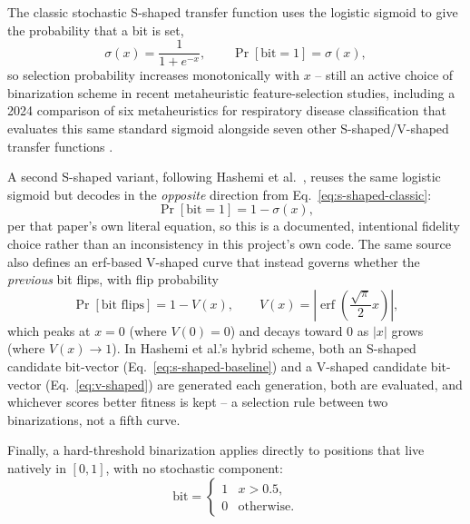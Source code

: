 The classic stochastic S-shaped transfer function uses the logistic
sigmoid to give the probability that a bit is set,
\begin{equation}
  \sigma(x) = \frac{1}{1 + e^{-x}}, \qquad
  \Pr[\text{bit} = 1] = \sigma(x),
  \label{eq:s-shaped-classic}
\end{equation}
so selection probability increases monotonically with $x$ -- still an
active choice of binarization scheme in recent metaheuristic
feature-selection studies, including a 2024 comparison of six
metaheuristics for respiratory disease classification that evaluates
this same standard sigmoid alongside seven other S-shaped/V-shaped
transfer functions \cite{Kuntalp:2024}.

A second S-shaped variant, following Hashemi et al.\ \cite{Hashemi:2026},
reuses the same logistic sigmoid but decodes in the \emph{opposite}
direction from Eq.~\ref{eq:s-shaped-classic}:
\begin{equation}
  \Pr[\text{bit} = 1] = 1 - \sigma(x),
  \label{eq:s-shaped-baseline}
\end{equation}
per that paper's own literal equation, so this is a documented,
intentional fidelity choice rather than an inconsistency in this
project's own code. The same source also defines an erf-based V-shaped
curve that instead governs whether the \emph{previous} bit flips, with
flip probability
\begin{equation}
  \Pr[\text{bit flips}] = 1 - V(x), \qquad
  V(x) = \left| \operatorname{erf}\!\left( \frac{\sqrt{\pi}}{2} x \right) \right|,
  \label{eq:v-shaped}
\end{equation}
which peaks at $x=0$ (where $V(0)=0$) and decays toward 0 as $|x|$ grows
(where $V(x) \to 1$). In Hashemi et al.'s \cite{Hashemi:2026} hybrid
scheme, both an S-shaped candidate bit-vector
(Eq.~\ref{eq:s-shaped-baseline}) and a V-shaped candidate bit-vector
(Eq.~\ref{eq:v-shaped}) are generated each generation, both are
evaluated, and whichever scores better fitness is kept -- a selection
rule between two binarizations, not a fifth curve.

Finally, a hard-threshold binarization \cite{Hashim:2023} applies
directly to positions that live natively in $[0,1]$, with no stochastic
component:
\begin{equation}
  \text{bit} =
  \begin{cases}
    1 & x > 0.5, \\
    0 & \text{otherwise}.
  \end{cases}
  \label{eq:threshold}
\end{equation}

